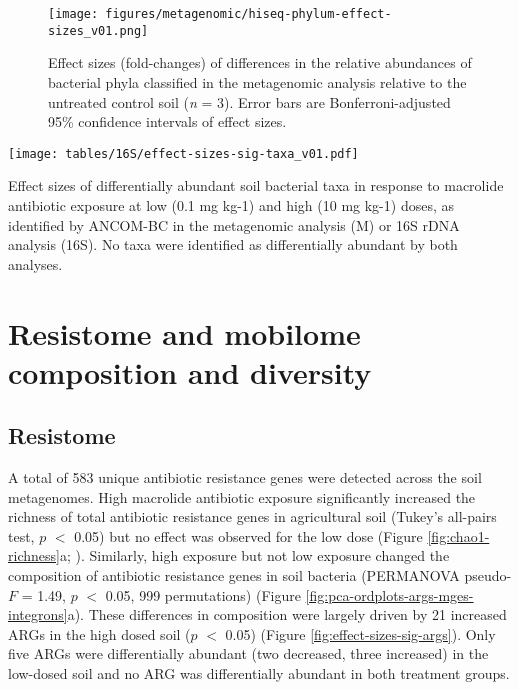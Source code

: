 \begin{figure}[htpb]
	\centering
		\texttt{[image: figures/metagenomic/hiseq-phylum-effect-sizes\_v01.png]}
	\caption[Effect sizes of bacterial phyla classified in the metagenomic analysis.]{
		Effect sizes (fold-changes) of differences in the relative abundances of bacterial phyla classified in the metagenomic analysis relative to the untreated control soil (\textit{n} = 3).
		Error bars are Bonferroni-adjusted 95\% confidence intervals of effect sizes.
	}
	\label{fig:metagenomic-phylum-effect-sizes}
\end{figure}

\begin{table}[htpb]
	\centering
		\texttt{[image: tables/16S/effect-sizes-sig-taxa\_v01.pdf]}
	\caption[Effect sizes of bacterial phyla classified in the metagenomic analysis.]{
		Effect sizes of differentially abundant soil bacterial taxa in response to macrolide antibiotic exposure at low (0.1 mg kg-1) and high (10 mg kg-1) doses, as identified by ANCOM-BC in the metagenomic analysis (M) or 16S rDNA analysis (16S). No taxa were identified as differentially abundant by both analyses.
	}
	\label{table:effect-sizes-sig-taxa}
\end{table}

\section{Resistome and mobilome composition and diversity}

\subsection{Resistome}

A total of 583 unique antibiotic resistance genes were detected across the soil metagenomes.
High macrolide antibiotic exposure significantly increased the richness of total antibiotic resistance genes in agricultural soil (Tukey’s all-pairs test, $p$ $<$ 0.05) but no effect was observed for the low dose (Figure \ref{fig:chao1-richness}a; \dummyfig).
Similarly, high exposure but not low exposure changed the composition of antibiotic resistance genes in soil bacteria (PERMANOVA pseudo-$F$ = 1.49, $p$ $<$ 0.05, 999 permutations) (Figure \ref{fig:pca-ordplots-args-mges-integrons}a).
These differences in composition were largely driven by 21 increased ARGs in the high dosed soil ($p$ $<$ 0.05) (Figure \ref{fig:effect-sizes-sig-args}).
Only five ARGs were differentially abundant (two decreased, three increased) in the low-dosed soil and no ARG was differentially abundant in both treatment groups.

